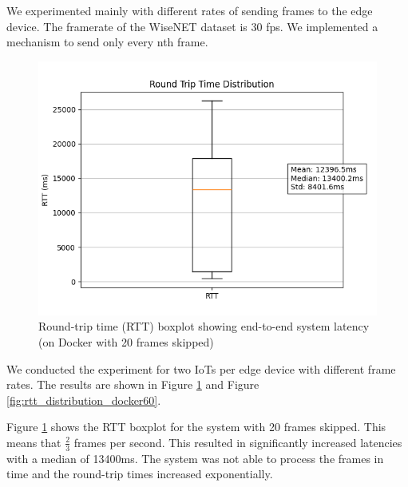 \documentclass[conference]{IEEEtran}
\begin{document}
We experimented mainly with different rates of sending frames to the edge device. The framerate of the WiseNET dataset is 30 fps. We implemented a mechanism to send only every nth frame.


\begin{figure}[!htbp]
    \centering
    \includegraphics[width=1\linewidth]{./res/rtt_distribution-local_docker_test20skip.png}
    \caption{Round-trip time (RTT) boxplot showing end-to-end system latency (on Docker with 20 frames skipped)}
    \label{fig:rtt_distribution_docker20}
\end{figure}
We conducted the experiment for two IoTs per edge device with different frame rates. The results are shown in Figure \ref{fig:rtt_distribution_docker20} and Figure \ref{fig:rtt_distribution_docker60}.


Figure \ref{fig:rtt_distribution_docker20} shows the RTT boxplot for the system with 20 frames skipped. This means that $\frac{2}{3}$ frames per second.
This resulted in significantly increased latencies with a median of 13400ms. The system was not able to process the frames in time and the round-trip times increased exponentially. 
\end{document}
